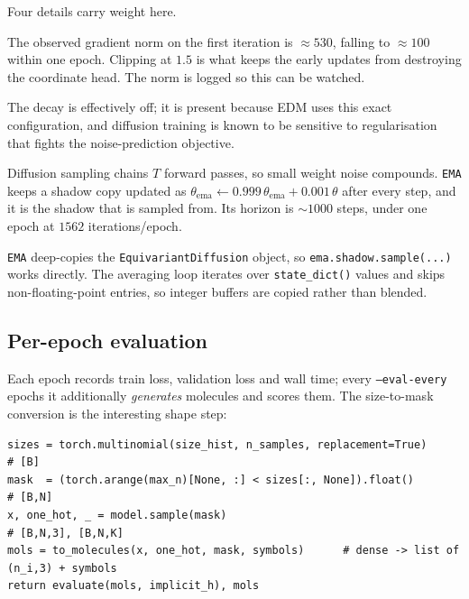 \documentclass[11pt,a4paper]{article}
\newcommand{\code}[1]{\texttt{#1}}
\begin{document}
\noindent
Four details carry weight here.

\begin{description}[leftmargin=0pt,style=nextline]
\item[Gradient clipping is not optional.] The observed gradient norm on the first
      iteration is $\approx 530$, falling to $\approx 100$ within one epoch.
      Clipping at $1.5$ is what keeps the early updates from destroying the
      coordinate head. The norm is logged so this can be watched.
\item[AdamW with \code{amsgrad}, $\text{lr}=10^{-4}$, weight decay $10^{-12}$.]
      The decay is effectively off; it is present because EDM uses this exact
      configuration, and diffusion training is known to be sensitive to
      regularisation that fights the noise-prediction objective.
\item[EMA of the weights.] Diffusion sampling chains $T$ forward passes, so
      small weight noise compounds. \code{EMA} keeps a shadow copy updated as
      $\theta_{\text{ema}} \leftarrow 0.999\,\theta_{\text{ema}} + 0.001\,\theta$
      after every step, and it is the shadow that is sampled from. Its horizon
      is $\sim\!1000$ steps, under one epoch at $1562$ iterations/epoch.
\item[The shadow is a whole diffusion model.] \code{EMA} deep-copies the
      \code{EquivariantDiffusion} object, so \code{ema.shadow.sample(...)} works
      directly. The averaging loop iterates over \code{state\_dict()} values and
      skips non-floating-point entries, so integer buffers are copied rather
      than blended.
\end{description}

\subsection{Per-epoch evaluation}

Each epoch records train loss, validation loss and wall time; every
\code{--eval-every} epochs it additionally \emph{generates} molecules and scores
them. The size-to-mask conversion is the interesting shape step:

\begin{lstlisting}[caption={\code{sample\_and\_score}}]
sizes = torch.multinomial(size_hist, n_samples, replacement=True)      # [B]
mask  = (torch.arange(max_n)[None, :] < sizes[:, None]).float()        # [B,N]
x, one_hot, _ = model.sample(mask)                                     # [B,N,3], [B,N,K]
mols = to_molecules(x, one_hot, mask, symbols)      # dense -> list of (n_i,3) + symbols
return evaluate(mols, implicit_h), mols
\end{lstlisting}
\end{document}
